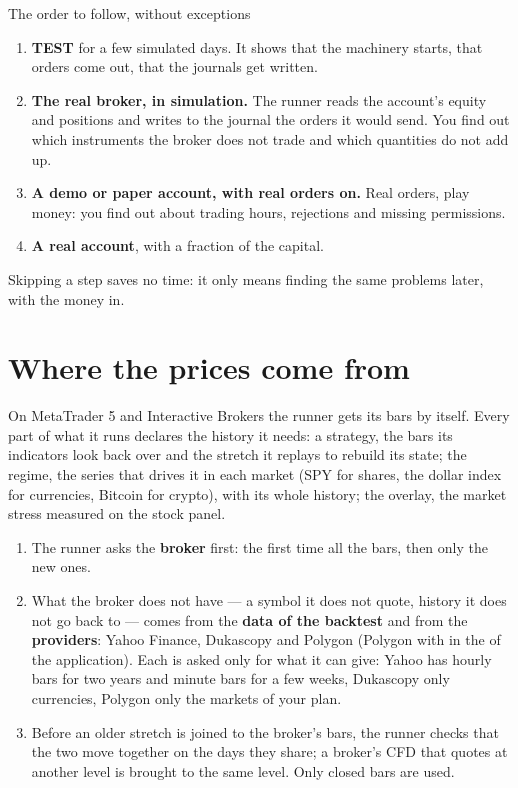 \begin{pratica}{The order to follow, without exceptions}
\begin{enumerate}
  \item \textbf{TEST} for a few simulated days. It shows that the machinery
        starts, that orders come out, that the journals get written.
  \item \textbf{The real broker, in simulation.} The runner reads the
        account's equity and positions and writes to the journal the orders
        it would send. You find out which instruments the broker does not
        trade and which quantities do not add up.
  \item \textbf{A demo or paper account, with real orders on.} Real orders,
        play money: you find out about trading hours, rejections and
        missing permissions.
  \item \textbf{A real account}, with a fraction of the capital.
\end{enumerate}
Skipping a step saves no time: it only means finding the same problems later,
with the money in.
\end{pratica}

\section{Where the prices come from}\label{sez:live-prices}

On MetaTrader 5 and Interactive Brokers the runner gets its bars by itself.
Every part of what it runs declares the history it needs: a strategy, the
bars its indicators look back over and the stretch it replays to rebuild its
state; the regime, the series that drives it in each market (SPY for
shares, the dollar index for currencies, Bitcoin for crypto), with its whole
history; the  overlay, the market stress measured on the
stock panel.

\begin{enumerate}
  \item The runner asks the \textbf{broker} first: the first time all the
        bars, then only the new ones.
  \item What the broker does not have --- a symbol it does not quote,
        history it does not go back to --- comes from the \textbf{data of
        the backtest} and from the \textbf{providers}: Yahoo Finance,
        Dukascopy and Polygon (Polygon with  in the
         of the application). Each is asked only for what it
        can give: Yahoo has hourly bars for two years and minute bars for a
        few weeks, Dukascopy only currencies, Polygon only the markets of
        your plan.
  \item Before an older stretch is joined to the broker's bars, the runner
        checks that the two move together on the days they share; a
        broker's CFD that quotes at another level is brought to the same
        level. Only closed bars are used.
\end{enumerate}

